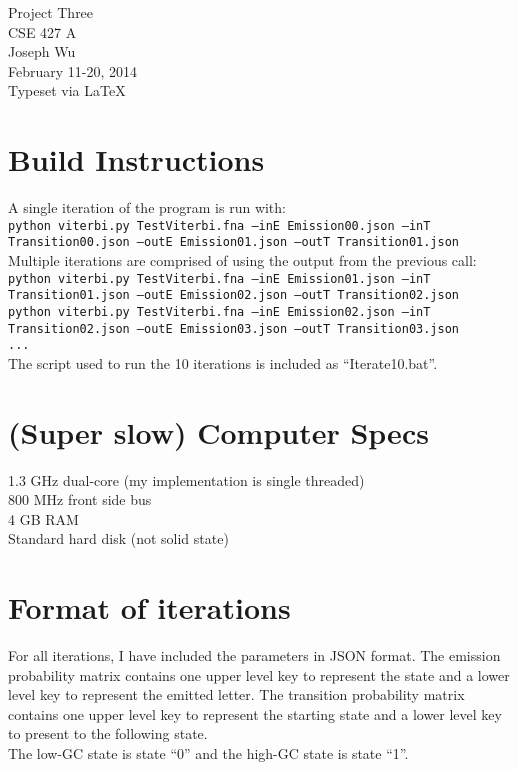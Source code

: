 \documentclass[a4paper, 12pt]{report}
\begin{document}
    \begin{center}
        {\LARGE Project Three} \\
        CSE 427 A \\
        Joseph Wu  \\
        February 11-20, 2014 \\
        {\tiny Typeset via \LaTeX}
    \end{center}

\section{Build Instructions}
    A single iteration of the program is run with: \\
    \texttt{python viterbi.py TestViterbi.fna --inE Emission00.json --inT Transition00.json --outE Emission01.json --outT Transition01.json} \\
    
    \noindent Multiple iterations are comprised of using the output from the previous call: \\
    \texttt{python viterbi.py TestViterbi.fna --inE Emission01.json --inT Transition01.json --outE Emission02.json --outT Transition02.json} \\
    \texttt{python viterbi.py TestViterbi.fna --inE Emission02.json --inT Transition02.json --outE Emission03.json --outT Transition03.json} \\
    \texttt{...} \\
    
    \noindent The script used to run the 10 iterations is included as ``Iterate10.bat''.
    
\section{(Super slow) Computer Specs}
    1.3 GHz dual-core (my implementation is single threaded) \\
    800 MHz front side bus \\
    4 GB RAM \\
    Standard hard disk (not solid state)
    
\section{Format of iterations}
    For all iterations, I have included the parameters in JSON format.
    The emission probability matrix contains one upper level key to represent the state
        and a lower level key to represent the emitted letter.
    The transition probability matrix contains one upper level key to represent the starting state
        and a lower level key to present to the following state.  \\
    The low-GC state is state ``0''
        and the high-GC state is state ``1''.  
\end{document}
